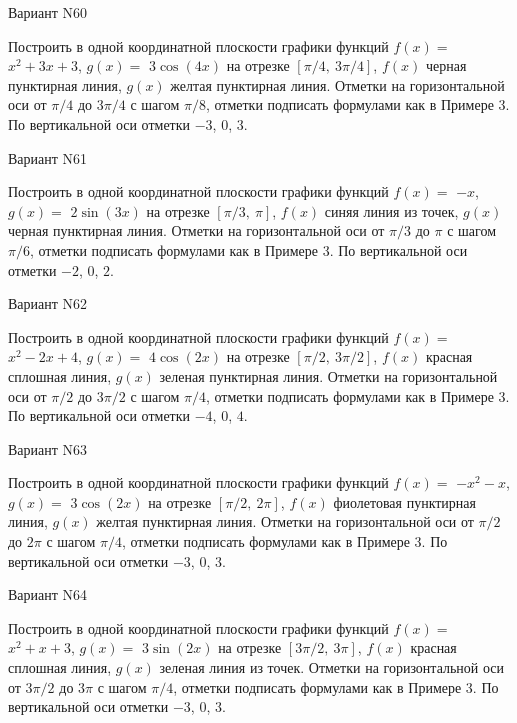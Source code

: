 \documentclass[11pt]{report}
\begin{document}
Вариант N60

Построить в одной координатной плоскости графики функций $f(x) = $
    $x^{2} + 3 x + 3$, $g(x) = $
    $3 \cos{\left(4 x \right)}$ на 
    отрезке $\left[ \pi / 4, \  3 \pi / 4\right]$, $f(x)$ черная 
    пунктирная линия, $g(x)$ желтая пунктирная линия. 
    Отметки на горизонтальной оси от $\pi / 4$ до $3 \pi / 4$ с 
    шагом $\pi / 8$, отметки подписать формулами как в Примере 3.  
    По вертикальной оси отметки $-3$, 0, $3$.

Вариант N61

Построить в одной координатной плоскости графики функций $f(x) = $
    $- x$, $g(x) = $
    $2 \sin{\left(3 x \right)}$ на 
    отрезке $\left[ \pi / 3, \  \pi\right]$, $f(x)$ синяя 
    линия из точек, $g(x)$ черная пунктирная линия. 
    Отметки на горизонтальной оси от $\pi / 3$ до $\pi$ с 
    шагом $\pi / 6$, отметки подписать формулами как в Примере 3.  
    По вертикальной оси отметки $-2$, 0, $2$.

Вариант N62

Построить в одной координатной плоскости графики функций $f(x) = $
    $x^{2} - 2 x + 4$, $g(x) = $
    $4 \cos{\left(2 x \right)}$ на 
    отрезке $\left[ \pi / 2, \  3 \pi / 2\right]$, $f(x)$ красная 
    сплошная линия, $g(x)$ зеленая пунктирная линия. 
    Отметки на горизонтальной оси от $\pi / 2$ до $3 \pi / 2$ с 
    шагом $\pi / 4$, отметки подписать формулами как в Примере 3.  
    По вертикальной оси отметки $-4$, 0, $4$.

Вариант N63

Построить в одной координатной плоскости графики функций $f(x) = $
    $- x^{2} - x$, $g(x) = $
    $3 \cos{\left(2 x \right)}$ на 
    отрезке $\left[ \pi / 2, \  2 \pi\right]$, $f(x)$ фиолетовая 
    пунктирная линия, $g(x)$ желтая пунктирная линия. 
    Отметки на горизонтальной оси от $\pi / 2$ до $2 \pi$ с 
    шагом $\pi / 4$, отметки подписать формулами как в Примере 3.  
    По вертикальной оси отметки $-3$, 0, $3$.

Вариант N64

Построить в одной координатной плоскости графики функций $f(x) = $
    $x^{2} + x + 3$, $g(x) = $
    $3 \sin{\left(2 x \right)}$ на 
    отрезке $\left[ 3 \pi / 2, \  3 \pi\right]$, $f(x)$ красная 
    сплошная линия, $g(x)$ зеленая линия из точек. 
    Отметки на горизонтальной оси от $3 \pi / 2$ до $3 \pi$ с 
    шагом $\pi / 4$, отметки подписать формулами как в Примере 3.  
    По вертикальной оси отметки $-3$, 0, $3$.
\end{document}
